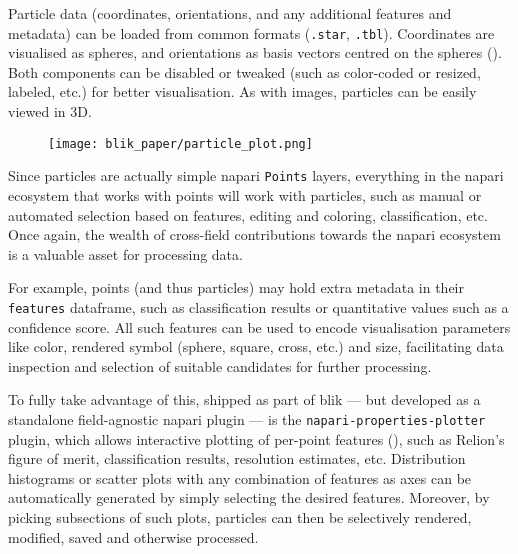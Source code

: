 Particle data (coordinates, orientations, and any additional features and metadata) can be loaded from common formats (\texttt{.star}, \texttt{.tbl}). Coordinates are visualised as spheres, and orientations as basis vectors centred on the spheres (). Both components can be disabled or tweaked (such as color-coded or resized, labeled, etc.) for better visualisation. As with images, particles can be easily viewed in 3D.

\begin{figure}
    \centering
    \texttt{[image: blik\_paper/particle\_plot.png]}
    \label{particles-showcase}
\end{figure}

Since particles are actually simple napari \texttt{Points} layers, everything in the napari ecosystem that works with points will work with particles, such as manual or automated selection based on features, editing and coloring, classification, etc. Once again, the wealth of cross-field contributions towards the napari ecosystem is a valuable asset for processing data.

For example, points (and thus particles) may hold extra metadata in their \texttt{features} dataframe, such as classification results or quantitative values such as a confidence score. All such features can be used to encode visualisation parameters like color, rendered symbol (sphere, square, cross, etc.) and size, facilitating data inspection and selection of suitable candidates for further processing.

To fully take advantage of this, shipped as part of blik --- but developed as a standalone field-agnostic napari plugin --- is the \texttt{napari-properties-plotter} plugin, which allows interactive plotting of per-point features (), such as Relion's figure of merit, classification results, resolution estimates, etc. Distribution histograms or scatter plots with any combination of features as axes can be automatically generated by simply selecting the desired features. Moreover, by picking subsections of such plots, particles can then be selectively rendered, modified, saved and otherwise processed.

